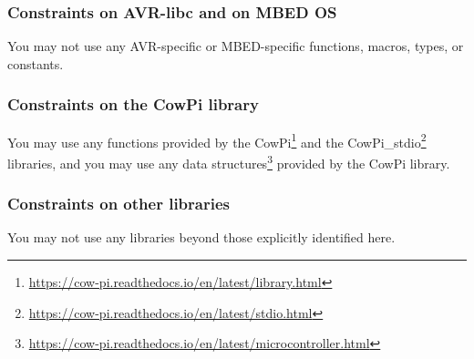 \subsubsection{Constraints on AVR-libc and on MBED OS}

You may not use any AVR-specific or MBED-specific functions, macros, types, or constants.

\subsubsection{Constraints on the CowPi library}

You may use any functions provided by the CowPi\footnote{
    \url{https://cow-pi.readthedocs.io/en/latest/library.html}
}
and the CowPi\_stdio\footnote{
    \url{https://cow-pi.readthedocs.io/en/latest/stdio.html}
} libraries,
and you may use any data structures\footnote{
    \url{https://cow-pi.readthedocs.io/en/latest/microcontroller.html}
} provided by the CowPi library.


\subsubsection{Constraints on other libraries}

You may not use any libraries beyond those explicitly identified here.